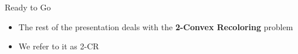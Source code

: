 \begin{frame}{Ready to Go}
\begin{itemize}
	
\item
The rest of the presentation deals with the \textbf{2-Convex Recoloring} problem

\pause\item
We refer to it as \alert{2-CR}
	
\end{itemize}
\end{frame}